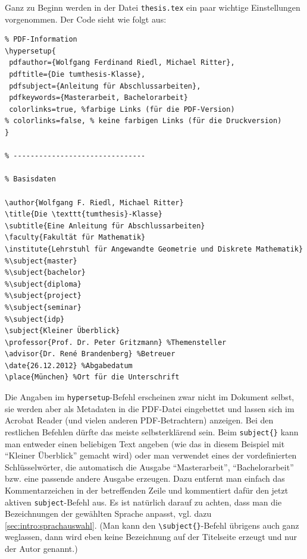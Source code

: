 Ganz zu Beginn werden in der Datei \texttt{thesis.tex} ein paar wichtige
Einstellungen vorgenommen. Der Code sieht wie folgt aus:

\begin{lstlisting}[language={[LaTeX]TeX}]
% -------------------------------
% PDF-Information
\hypersetup{
 pdfauthor={Wolfgang Ferdinand Riedl, Michael Ritter},
 pdftitle={Die tumthesis-Klasse},
 pdfsubject={Anleitung für Abschlussarbeiten},
 pdfkeywords={Masterarbeit, Bachelorarbeit}
 colorlinks=true, %farbige Links (für die PDF-Version)
% colorlinks=false, % keine farbigen Links (für die Druckversion)
}

% -------------------------------

% Basisdaten 

\author{Wolfgang F. Riedl, Michael Ritter}
\title{Die \texttt{tumthesis}-Klasse}
\subtitle{Eine Anleitung für Abschlussarbeiten}
\faculty{Fakultät für Mathematik}
\institute{Lehrstuhl für Angewandte Geometrie und Diskrete Mathematik}
%\subject{master}
%\subject{bachelor}
%\subject{diploma}
%\subject{project}
%\subject{seminar}
%\subject{idp}
\subject{Kleiner Überblick}
\professor{Prof. Dr. Peter Gritzmann} %Themensteller
\advisor{Dr. René Brandenberg} %Betreuer
\date{26.12.2012} %Abgabedatum
\place{München} %Ort für die Unterschrift
\end{lstlisting}

Die Angaben im \verb|hypersetup|-Befehl erscheinen zwar nicht im Dokument
selbst, sie werden aber als Metadaten in die PDF-Datei eingebettet und lassen
sich im Acrobat Reader (und vielen anderen PDF-Betrachtern) anzeigen. Bei den
restlichen Befehlen dürfte das meiste selbsterklärend sein. Beim
\verb|subject{}| kann man entweder einen beliebigen Text angeben (wie das in
diesem Beispiel mit \enquote{Kleiner Überblick} gemacht wird) oder man verwendet
eines der vordefinierten Schlüsselwörter, die automatisch die Ausgabe
\enquote{Masterarbeit}, \enquote{Bachelorarbeit} bzw. eine passende andere
Ausgabe erzeugen.  Dazu entfernt man einfach das Kommentarzeichen in der
betreffenden Zeile und kommentiert dafür den jetzt aktiven \verb|subject|-Befehl
aus. Es ist natürlich darauf zu achten, dass man die Bezeichnungen der gewählten
Sprache anpasst, vgl. dazu \cref{sec:intro:sprachauswahl}. (Man kann den
\verb|\subject{}|-Befehl übrigens auch ganz weglassen, dann wird eben keine
Bezeichnung auf der Titelseite erzeugt und nur der Autor genannt.)

